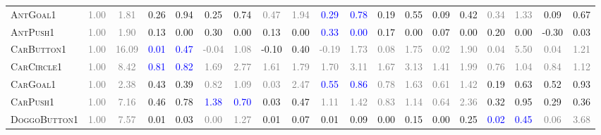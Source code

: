 \documentclass{article}
\begin{document}
\begin{table}[ht]
{\begin{tabular}{@{}l|cc|cc|cc|cc|cc|cc|cc|cc|cc@{}}
\textsc{AntGoal1} & \textcolor{gray}{1.00} & \textcolor{gray}{1.81} & 0.26 & 0.94 & 0.25 & 0.74 & \textcolor{gray}{0.47} & \textcolor{gray}{1.94} & \textcolor{blue}{0.29} & \textcolor{blue}{0.78} & 0.19 & 0.55 & 0.09 & 0.42 & \textcolor{gray}{0.34} & \textcolor{gray}{1.33} & 0.09 & 0.67 \\
\textsc{AntPush1} & \textcolor{gray}{1.00} & \textcolor{gray}{1.90} & 0.13 & 0.00 & 0.30 & 0.00 & 0.13 & 0.00 & \textcolor{blue}{0.33} & \textcolor{blue}{0.00} & 0.17 & 0.00 & 0.07 & 0.00 & 0.20 & 0.00 & -0.30 & 0.03 \\
\textsc{CarButton1} & \textcolor{gray}{1.00} & \textcolor{gray}{16.09} & \textcolor{blue}{0.01} & \textcolor{blue}{0.47} & \textcolor{gray}{-0.04} & \textcolor{gray}{1.08} & -0.10 & 0.40 & \textcolor{gray}{-0.19} & \textcolor{gray}{1.73} & \textcolor{gray}{0.08} & \textcolor{gray}{1.75} & \textcolor{gray}{0.02} & \textcolor{gray}{1.90} & \textcolor{gray}{0.04} & \textcolor{gray}{5.50} & \textcolor{gray}{0.04} & \textcolor{gray}{1.21} \\
\textsc{CarCircle1} & \textcolor{gray}{1.00} & \textcolor{gray}{8.42} & \textcolor{blue}{0.81} & \textcolor{blue}{0.82} & \textcolor{gray}{1.69} & \textcolor{gray}{2.77} & \textcolor{gray}{1.61} & \textcolor{gray}{1.79} & \textcolor{gray}{1.70} & \textcolor{gray}{3.11} & \textcolor{gray}{1.67} & \textcolor{gray}{3.13} & \textcolor{gray}{1.41} & \textcolor{gray}{1.99} & \textcolor{gray}{0.76} & \textcolor{gray}{1.04} & \textcolor{gray}{0.84} & \textcolor{gray}{1.12} \\
\textsc{CarGoal1} & \textcolor{gray}{1.00} & \textcolor{gray}{2.38} & 0.43 & 0.39 & \textcolor{gray}{0.82} & \textcolor{gray}{1.09} & \textcolor{gray}{0.03} & \textcolor{gray}{2.47} & \textcolor{blue}{0.55} & \textcolor{blue}{0.86} & \textcolor{gray}{0.78} & \textcolor{gray}{1.63} & \textcolor{gray}{0.61} & \textcolor{gray}{1.42} & 0.19 & 0.63 & 0.52 & 0.93 \\
\textsc{CarPush1} & \textcolor{gray}{1.00} & \textcolor{gray}{7.16} & 0.46 & 0.78 & \textcolor{blue}{1.38} & \textcolor{blue}{0.70} & 0.03 & 0.47 & \textcolor{gray}{1.11} & \textcolor{gray}{1.42} & \textcolor{gray}{0.83} & \textcolor{gray}{1.14} & \textcolor{gray}{0.64} & \textcolor{gray}{2.36} & 0.32 & 0.95 & 0.29 & 0.36 \\
\textsc{DoggoButton1} & \textcolor{gray}{1.00} & \textcolor{gray}{7.57} & 0.01 & 0.03 & \textcolor{gray}{0.00} & \textcolor{gray}{1.27} & 0.01 & 0.07 & 0.01 & 0.09 & 0.00 & 0.15 & 0.00 & 0.25 & \textcolor{blue}{0.02} & \textcolor{blue}{0.45} & \textcolor{gray}{0.06} & \textcolor{gray}{3.68} \\

\end{tabular}}
\end{table}
\end{document}
